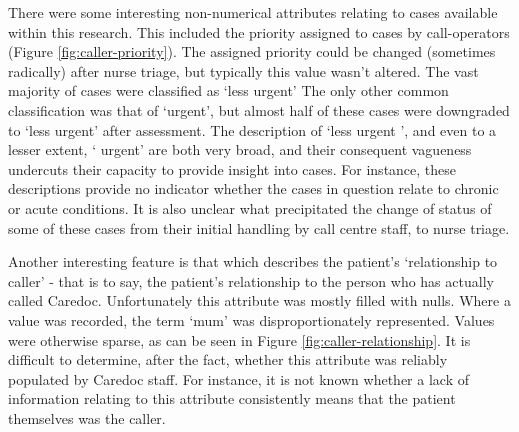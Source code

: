    There were some interesting non-numerical attributes relating to cases available within this research. This included the priority assigned to cases by call-operators (Figure \ref{fig:caller-priority}). The assigned priority could be changed (sometimes radically) after nurse triage, but typically this value wasn't altered. The vast majority of cases were classified as `less urgent'  The only other common classification was that of `urgent', but almost  half of these cases were downgraded to `less urgent' after assessment. The description of `less urgent ', and even to a lesser extent, ` urgent' are both very broad, and their consequent vagueness undercuts their capacity to provide insight into cases. For instance, these descriptions provide no indicator whether the cases in question relate to chronic or acute conditions. It is also unclear what precipitated the change of status of some of these cases from their initial handling by call centre staff, to nurse triage. 
 
 
 
 
 
 

 
 Another interesting feature is that which describes the patient's `relationship to caller' - that is to say, the patient's relationship to the person who has actually called Caredoc. Unfortunately this attribute was mostly filled with nulls. Where a value was recorded, the term `mum' was disproportionately represented. Values were otherwise sparse, as can be seen in Figure \ref{fig:caller-relationship}. It is difficult to determine, after the fact, whether this attribute was reliably populated by Caredoc staff. For instance, it is not known whether a lack of information relating to this attribute consistently means that the patient themselves was the caller.
 

